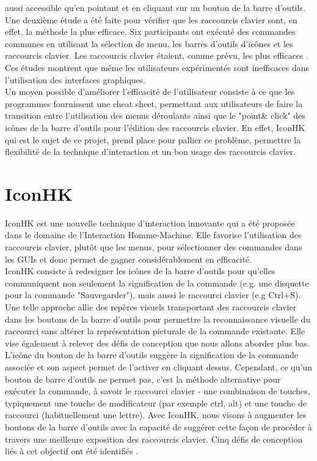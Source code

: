 \documentclass[12pt,a4paper]{article}
\newcommand\tab[1][0.65cm]{\hspace*{#1}}
\begin{document}
aussi accessible qu'en pointant et en cliquant sur un bouton de la barre d’outils.\\
\tab Une deuxième étude a été faite pour vérifier que les raccourcis clavier sont, en effet, la méthode la plus efficace. Six participants ont exécuté des commandes communes en utilisant la sélection de
menu, les barres d'outils d'icônes et les raccourcis clavier. Les raccourcis clavier étaient, comme prévu, les plus efficaces \cite{1}. Ces études montrent que même les utilisateurs expérimentés sont inefficaces dans l'utilisation des interfaces graphiques.\\
\tab Un moyen possible d'améliorer l'efficacité de l'utilisateur consiste à ce que les programmes fournissent une cheat sheet, permettant aux utilisateurs de faire la transition entre l'utilisation des menus déroulants ainsi que le "point\& click" des icônes de la barre d’outils pour l'édition des raccourcis clavier. En effet, IconHK qui est le sujet de ce projet, prend place pour pallier ce problème, permettre la flexibilité de la technique d’interaction et un bon usage des raccourcis clavier.
\section{IconHK}
IconHK est une nouvelle technique d'interaction innovante qui a été proposée dans le domaine de l’Interaction Homme-Machine. Elle favorise l'utilisation des raccourcis clavier, plutôt que les
menus, pour sélectionner des commandes dans les GUIs et donc permet de gagner considérablement en efficacité.\\
\tab IconHK consiste à redesigner les icônes de la barre d'outils pour qu'elles communiquent non seulement la signification de la commande (e.g. une disquette pour la commande "Sauvegarder"), mais aussi le raccourci clavier (e.g Ctrl+S).\\
\tab Une telle approche allie des repères visuels transportant des raccourcis clavier dans les boutons de la barre d’outils pour permettre la reconnaissance visuelle du raccourci sans altérer la représentation
picturale de la commande existante. Elle vise également à relever des défis de conception que nous allons aborder plus bas.\\
\tab L’icône du bouton de la barre d’outils suggère la signification de la commande associée et son aspect permet de l'activer en cliquant dessus. Cependant, ce qu'un bouton de barre d'outils ne permet pas, c’est la méthode alternative pour exécuter la commande, à savoir le raccourci clavier - une combinaison de touches, typiquement une touche de modificateur (par exemple ctrl, alt) et une touche de raccourci (habituellement une lettre). Avec IconHK, nous visons à augmenter les boutons de la barre d'outils avec la capacité de suggérer cette façon de procéder à travers une meilleure exposition des raccourcis clavier. Cinq défis de conception liés à cet objectif ont été identifiés \cite{3}.
\end{document}
